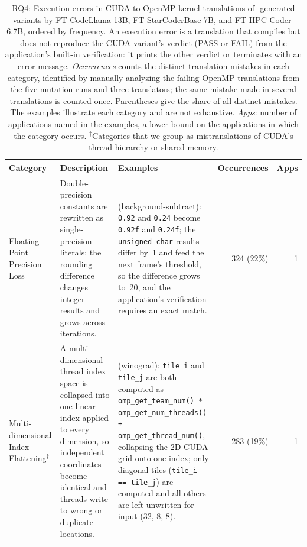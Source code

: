 \begin{table}[!t]
\centering
\scriptsize
\caption{RQ4: Execution errors in CUDA-to-OpenMP kernel translations of \toolname-generated variants by FT-CodeLlama-13B, FT-StarCoderBase-7B, and FT-HPC-Coder-6.7B, ordered by frequency. An execution error is a translation that compiles but does not reproduce the CUDA variant's verdict (PASS or FAIL) from the application's built-in verification: it prints the other verdict or terminates with an error message. \emph{Occurrences} counts the distinct translation mistakes in each category, identified by manually analyzing the failing OpenMP translations from the five mutation runs and three translators; the same mistake made in several translations is counted once. Parentheses give the share of all distinct mistakes. The examples illustrate each category and are not exhaustive. \emph{Apps}: number of applications named in the examples, a lower bound on the applications in which the category occurs. $^\dagger$Categories that we group as mistranslations of CUDA's thread hierarchy or shared memory.}
\label{tab:error_taxonomy_kernel_translation_runtime}
\setlength{\tabcolsep}{3pt}
\begin{tabular}{@{}>{\raggedright\arraybackslash}p{2.1cm}>{\raggedright\arraybackslash}p{4.4cm}>{\raggedright\arraybackslash}p{8.0cm}rr@{}}
\toprule
\textbf{Category} & \textbf{Description} & \textbf{Examples} & \textbf{Occurrences} & \textbf{Apps} \\
\midrule
Floating-Point Precision Loss & Double-precision constants are rewritten as single-precision literals; the rounding difference changes integer results and grows across iterations. & (background-subtract): \texttt{0.92} and \texttt{0.24} become \texttt{0.92f} and \texttt{0.24f}; the \texttt{unsigned char} results differ by~1 and feed the next frame's threshold, so the difference grows to~20, and the application's verification requires an exact match. & 324 (22\%) & 1 \\
\midrule
Multi-dimensional Index Flattening$^\dagger$ & A multi-dimensional thread index space is collapsed into one linear index applied to every dimension, so independent coordinates become identical and threads write to wrong or duplicate locations. & (winograd): \texttt{tile\_i} and \texttt{tile\_j} are both computed as \texttt{omp\_get\_team\_num() * omp\_get\_num\_threads() + omp\_get\_thread\_num()}, collapsing the 2D CUDA grid onto one index; only diagonal tiles (\texttt{tile\_i == tile\_j}) are computed and all others are left unwritten for input (32, 8, 8). & 283 (19\%) & 1 \\

\end{tabular}
\end{table}
